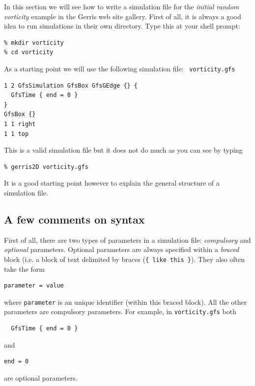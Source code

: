 \documentclass[a4paper]{article}
\begin{document}
In this section we will see how to write a simulation file for the
{\em initial random vorticity} example in the Gerris web site
gallery. First of all, it is always a good idea to run simulations in
their own directory. Type this at your shell prompt:
\begin{verbatim}
% mkdir vorticity
% cd vorticity
\end{verbatim}
As a starting point we will use the following simulation file: {\tt
vorticity.gfs}
\begin{verbatim}
1 2 GfsSimulation GfsBox GfsGEdge {} {
  GfsTime { end = 0 }
}
GfsBox {}
1 1 right
1 1 top
\end{verbatim}
This is a valid simulation file but it does not do much as you can see 
by typing
\begin{verbatim}
% gerris2D vorticity.gfs
\end{verbatim}
It is a good starting point however to explain the general structure
of a simulation file.

\subsection{A few comments on syntax}

First of all, there are two types of parameters in a simulation file:
{\em compulsory} and {\em optional} parameters. Optional parameters
are always specified within a {\em braced} block (i.e. a block of text 
delimited by braces ({\tt \{ like this \}}). They also often take the form
\begin{verbatim}
parameter = value
\end{verbatim}
where {\tt parameter} is an unique identifier (within this braced
block). All the other parameters are compulsory parameters.
For example, in {\tt vorticity.gfs} both
\begin{verbatim}
  GfsTime { end = 0 }
\end{verbatim}
and
\begin{verbatim}
end = 0
\end{verbatim}
are optional parameters.
\end{document}
